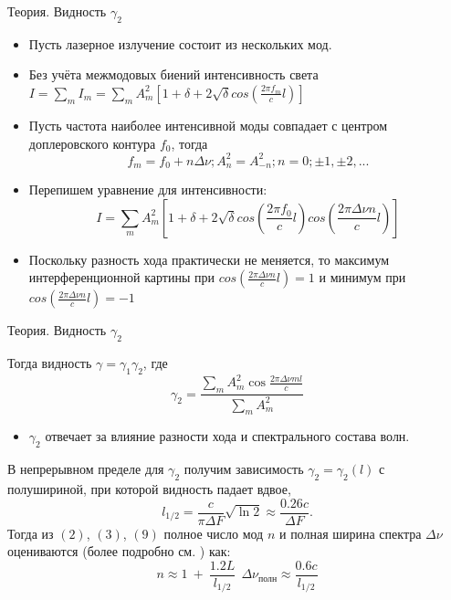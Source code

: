 \documentclass[11pt]{beamer} %
\begin{document}
    \begin{frame}{Теория. Видность $\gamma_2$}
        \begin{itemize}
            \item Пусть лазерное излучение состоит из нескольких мод.
            \item Без учёта межмодовых биений интенсивность света $I = \sum\limits_m I_m = \sum\limits_m A_m^2 \left[ 1 + \delta + 2\sqrt{\delta} cos(\frac{2\pi f_m}{c}l) \right]$
            \item Пусть частота наиболее интенсивной моды совпадает с центром доплеровского контура $f_0$, тогда 
            $$f_m = f_0 + n\Delta \nu; A_n^2 = A_{-n}^2; n = 0; \pm 1, \pm 2, ...$$
            \item Перепишем уравнение для интенсивности:
            \begin{equation}
                I = \sum\limits_m A_m^2 \left[ 1 + \delta + 2\sqrt{\delta} cos(\frac{2\pi f_0}{c}l) cos(\frac{2\pi \Delta \nu n}{c}l) \right]
            \end{equation}
            \item Поскольку разность хода практически не меняется, то максимум интерференционной картины при $cos(\frac{2\pi \Delta \nu n}{c}l) = 1$ и минимум при $cos(\frac{2\pi \Delta \nu n}{c}l) = -1$
        \end{itemize}
    \end{frame}

    \begin{frame}{Теория. Видность $\gamma_2$}

        Тогда видность $\gamma = \gamma_1\gamma_2$, где 
            \begin{equation}
                \gamma_2 = \dfrac{\sum\limits_m A^2_m \cos \frac{2\pi \Delta \nu m l}{c}}{\sum\limits_m A_m^2}
            \end{equation}
        \begin{itemize}
            \item $\gamma_2$ отвечает за влияние разности хода и спектрального состава волн. 
        \end{itemize}
        В непрерывном пределе для $\gamma_2$ получим зависимость $\gamma_2 = \gamma_2(l)$ с полушириной, при которой видность падает вдвое,
        \begin{equation}
        l_{1/2} = \dfrac{c}{\pi \Delta F}\sqrt{\ln 2} \approx \dfrac{0.26 c}{\Delta F}.
        \end{equation}
        Тогда из $(2)$, $(3)$, $(9)$ полное число мод $n$ и полная ширина спектра $\Delta\nu$ оцениваются (более подробно см. \cite{lab}) как:
         \begin{equation}
            n \approx 1 \ + \ \frac{1.2L}{l_{1/2}} \ \ \Delta \nu_{\text{полн}} \approx \frac{0.6c}{l_{1/2}}
        \end{equation}
    \end{frame}
\end{document}
